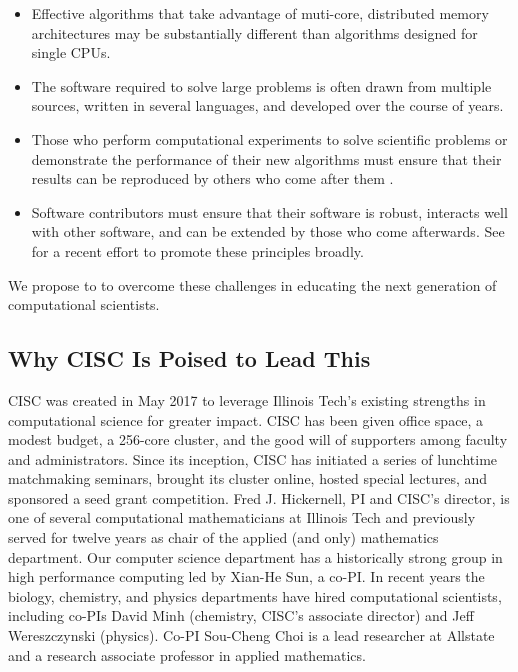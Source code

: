 \documentclass[11pt]{NSFamsart}
\begin{document}
\begin{itemize}

\item Effective algorithms that take advantage of muti-core, distributed memory architectures may be substantially different than algorithms designed for single CPUs.

\item The software required to solve large problems is often drawn from multiple sources, written in several languages, and developed over the course of years.

\item Those who perform computational experiments to solve scientific problems or demonstrate the performance of their new algorithms must ensure that their results can be reproduced by others who come after them \cite{Pen11}.  

\item Software contributors must ensure that their software is robust, interacts well with other software, and can be extended by those who come afterwards.  See \cite{BSS18} for a recent effort to promote these principles broadly.

\end{itemize}

We propose to to overcome these challenges in educating the next generation of computational scientists.

\subsection*{Why CISC Is Poised to Lead This}
CISC was created in May 2017 to leverage Illinois Tech’s existing strengths in computational science for greater impact.  CISC has been given office space, a modest budget, a 256-core cluster, and the good will of supporters among faculty and administrators.  Since its inception, CISC has initiated a series of lunchtime matchmaking seminars, brought its cluster online, hosted special lectures, and sponsored a seed grant competition. Fred J. Hickernell, PI and CISC’s director, is one of several computational mathematicians at Illinois Tech and previously served for twelve years as chair of the applied (and only) mathematics department.  Our computer science department has a historically strong group in high performance computing led by Xian-He Sun, a co-PI.  In recent years the biology, chemistry, and physics departments have hired computational scientists, including co-PIs David Minh (chemistry, CISC's associate director) and Jeff Wereszczynski (physics).  Co-PI Sou-Cheng Choi is a lead researcher at Allstate and a research associate professor in applied mathematics.
\end{document}
